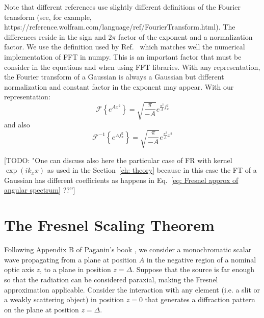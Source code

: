\documentclass{iucr}              %
\newcommand{\todo}[1]{{\color{red}[TODO: "#1'']}}
\newcommand{\inblue}[1]{{\color{blue}#1}}
\begin{document}
Note that different references use slightly different definitions of the Fourier transform (see, for example, \inblue{https://reference.wolfram.com/language/ref/FourierTransform.html}). The differences reside in the sign and $2 \pi$ factor of the exponent and a normalization factor. We use the definition used by Ref.~\cite{goodmanfourier} which matches well the numerical implementation of FFT in numpy. This is an important factor that must be consider in the equations and when using FFT libraries. With any representation, the Fourier transform of a Gaussian is always a Gaussian but different normalization and constant factor in the exponent may appear. With our representation:
\begin{equation}
\mathcal{F}\left\{ e^{A x^2} \right\} = \sqrt{\frac{\pi}{-A}} e^{\frac{\pi^2}{A} f_x^2}
\end{equation}
and also
\begin{equation}
\mathcal{F}^{-1}\left\{ e^{A f_x^2} \right\} = \sqrt{\frac{\pi}{-A}} e^{\frac{\pi^2}{A} x^2}
\end{equation}

\todo{One can discuss also here the particular case of FR with kernel $\exp(ik_x x)$ as used in the Section~\ref{ch: theory} because in this case the FT of a Gaussian has different coefficients as happens in Eq.~\ref{eq: Fresnel approx of angular spectrum} ??}

\section{The Fresnel Scaling Theorem}
\label{appendix_scaling}

Following Appendix B of Paganin's book \cite{paganin_book}, we consider a monochromatic scalar wave propagating from a plane at position $A$ in the negative region of a nominal optic axis $z$, to a plane in position $z=\Delta$. Suppose that the source is far enough so that the radiation can be considered paraxial, making the Fresnel approximation applicable. Consider the interaction with any element (i.e. a slit or a weakly scattering object) in position $z=0$ that generates a diffraction pattern on the plane at position $z=\Delta$. 
\end{document}
